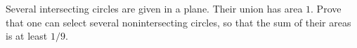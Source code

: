 Several intersecting circles are given in a plane. Their union has area $1$. Prove that one can select several nonintersecting circles, so that the sum of their areas is at least $1/9$.
